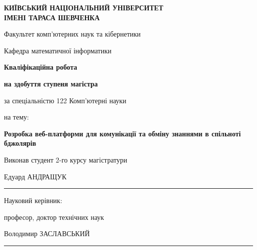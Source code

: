 
\begin{titlepage}
    \centering
    \setlength{\parskip}{0.5em} %

    {\fontsize{14}{16}\selectfont \textbf{КИЇВСЬКИЙ НАЦІОНАЛЬНИЙ УНІВЕРСИТЕТ \\ ІМЕНІ ТАРАСА ШЕВЧЕНКА}\par}
    {\fontsize{12}{14}\selectfont Факультет комп'ютерних наук та кібернетики\par}
    {\fontsize{12}{14}\selectfont Кафедра математичної інформатики\par} %

    \vfill %

    {\fontsize{16}{18}\selectfont \textbf{Кваліфікаційна робота}\par}
    {\fontsize{12}{14}\selectfont \textbf{на здобуття ступеня магістра}\par}
    {\fontsize{12}{14}\selectfont за спеціальністю 122 Комп'ютерні науки\par}
    {\fontsize{12}{14}\selectfont на тему:\par}
    {\fontsize{14}{16}\selectfont \textbf{Розробка веб-платформи для комунікації та обміну знаннями в спільноті бджолярів}\par} %

    \vfill %

    \begin{minipage}[t]{0.9\textwidth} %
        \fontsize{12}{14}\selectfont
        Виконав студент 2-го курсу магістратури\par
        Едуард АНДРАЩУК \hfill \rule{5cm}{0.4pt}
        
        \vspace{1.5cm} %
        
        Науковий керівник:\par
        професор, доктор технічних наук\par
        Володимир ЗАСЛАВСЬКИЙ \hfill \rule{5cm}{0.4pt}
    \end{minipage}


\end{titlepage}
